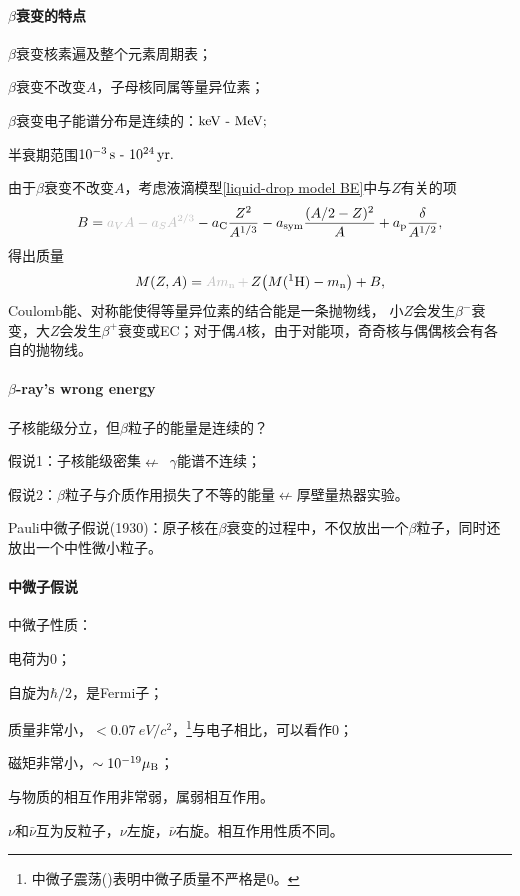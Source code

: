 \paragraph{$\beta$衰变的特点}
\begin{compactenum}
	\item $\beta$衰变核素遍及整个元素周期表；
	\item $\beta$衰变不改变$A$，子母核同属等量异位素；
	\item $\beta$衰变电子能谱分布是连续的：$\si{keV}\vs\si{MeV};$
	\item 半衰期范围$10^{-3}\,\mathrm{s}\vs\SI{e24}{yr}.$
\end{compactenum}
由于$\beta$衰变不改变$A$，考虑液滴模型\eqref{liquid-drop model BE}中与$Z$有关的项
\[
	B=\textcolor{lightgray}{a_VA-a_SA^{2/3}}-a_\mathrm C\frac{Z^2}{A^{1/3}}-a_\mathrm{sym}\frac{(A/2-Z)^2}{A}+a_\mathrm p\frac{\delta}{A^{1/2}},
\]
得出质量
\[
	M(Z,A)=\textcolor{lightgray}{Am_\nton\,+\,}Z\bigkh{M(\nucli1H)-m_\nton}+B,
\]
Coulomb能、对称能使得等量异位素的结合能是一条抛物线，%
小$Z$会发生$\beta^-$衰变，大$Z$会发生$\beta^+$衰变或EC；对于偶$A$核，由于对能项，奇奇核与偶偶核会有各自的抛物线。

\paragraph{$\beta$-ray's wrong energy}子核能级分立，但$\beta$粒子的能量是连续的？
\begin{compactitem}
	\item 假说1：子核能级密集$\nleftarrow$~$\gamma$能谱不连续；
	\item 假说2：$\beta$粒子与介质作用损失了不等的能量$\nleftarrow$厚壁量热器实验。
\end{compactitem}
Pauli中微子假说(1930)：原子核在$\beta$衰变的过程中，不仅放出一个$\beta$粒子，同时还放出一个中性微小粒子。
\paragraph{中微子假说}中微子性质：
\begin{compactenum}
	\item 电荷为0；
	\item 自旋为$\hbar/2$，是Fermi子；
	\item 质量非常小，\href{https://www.sciencedirect.com/topics/chemistry/electron-neutrino}{$<\SI{0.07}{eV}/c^2$}，\footnote{中微子震荡()表明中微子质量不严格是0。}与电子相比，可以看作0；
	\item 磁矩非常小，\href{https://arxiv.org/ftp/arxiv/papers/1506/1506.01284.pdf}{$\sim 10^{-19}\muB$}；
	\item 与物质的相互作用非常弱，属弱相互作用。
\end{compactenum}
$\nu$和$\bar\nu$互为反粒子，$\nu$左旋，$\bar\nu$右旋。相互作用性质不同。

